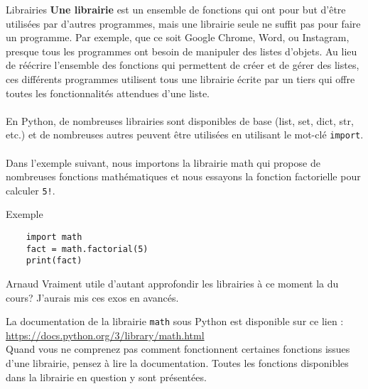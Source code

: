 \begin{section}{Librairies}
    \textbf{Une librairie} est un ensemble de fonctions qui ont pour but d'être utilisées par d'autres programmes, mais une librairie seule ne suffit pas pour faire un programme. Par exemple, que ce soit Google Chrome, Word, ou Instagram, presque tous les programmes ont besoin de manipuler des listes d'objets. Au lieu de réécrire l'ensemble des fonctions qui permettent de créer et de gérer des listes, ces différents programmes utilisent tous une librairie écrite par un tiers qui offre toutes les fonctionnalités attendues d'une liste.
\\\\
En Python, de nombreuses librairies sont disponibles de base (list, set, dict, str, etc.) et de nombreuses autres peuvent être utilisées en utilisant le mot-clé \lstinline{import}.
\\\\
Dans l'exemple suivant, nous importons la librairie math qui propose de nombreuses fonctions mathématiques et nous essayons la fonction factorielle pour calculer \lstinline{5!}.
\begin{Example}{\faTerminal Exemple}
    \begin{lstlisting}
    import math
    fact = math.factorial(5)
    print(fact)\end{lstlisting}
\end{Example}
\begin{note}{Arnaud}
    Vraiment utile d'autant approfondir les librairies à ce moment la du cours? J'aurais mis ces exos en avancés.
    \end{note}

\begin{conseil}
	La documentation de la librairie \lstinline{math} sous Python est disponible sur ce lien : \url{https://docs.python.org/3/library/math.html} \\
Quand vous ne comprenez pas comment fonctionnent certaines fonctions issues d'une librairie, pensez à lire la documentation. Toutes les fonctions disponibles dans la librairie en question y sont présentées.


\end{conseil}
\end{section}
